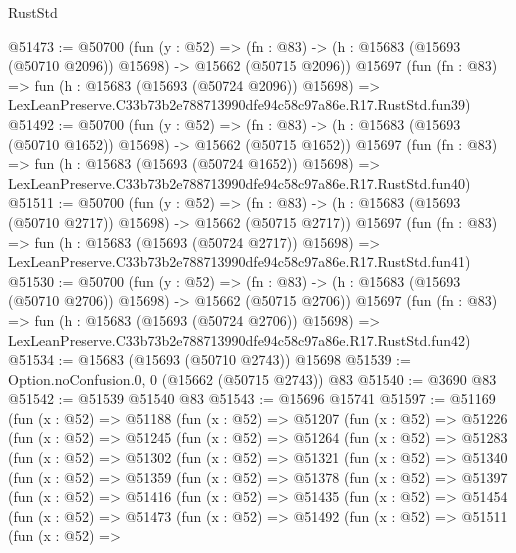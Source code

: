 \begin{lexlean}{RustStd}
\begin{coremodule}
@51473 := @50700
    (fun (y : @52) =>
    (fn : @83) -> (h : @15683 (@15693 (@50710 @2096)) @15698) -> @15662 (@50715 @2096))
    @15697
    (fun (fn : @83) =>
    fun (h : @15683 (@15693 (@50724 @2096)) @15698) =>
    LexLeanPreserve.C33b73b2e788713990dfe94c58c97a86e.R17.RustStd.fun39)
@51492 := @50700
    (fun (y : @52) =>
    (fn : @83) -> (h : @15683 (@15693 (@50710 @1652)) @15698) -> @15662 (@50715 @1652))
    @15697
    (fun (fn : @83) =>
    fun (h : @15683 (@15693 (@50724 @1652)) @15698) =>
    LexLeanPreserve.C33b73b2e788713990dfe94c58c97a86e.R17.RustStd.fun40)
@51511 := @50700
    (fun (y : @52) =>
    (fn : @83) -> (h : @15683 (@15693 (@50710 @2717)) @15698) -> @15662 (@50715 @2717))
    @15697
    (fun (fn : @83) =>
    fun (h : @15683 (@15693 (@50724 @2717)) @15698) =>
    LexLeanPreserve.C33b73b2e788713990dfe94c58c97a86e.R17.RustStd.fun41)
@51530 := @50700
    (fun (y : @52) =>
    (fn : @83) -> (h : @15683 (@15693 (@50710 @2706)) @15698) -> @15662 (@50715 @2706))
    @15697
    (fun (fn : @83) =>
    fun (h : @15683 (@15693 (@50724 @2706)) @15698) =>
    LexLeanPreserve.C33b73b2e788713990dfe94c58c97a86e.R17.RustStd.fun42)
@51534 := @15683 (@15693 (@50710 @2743)) @15698
@51539 := Option.noConfusion.{0, 0} (@15662 (@50715 @2743)) @83
@51540 := @3690 @83
@51542 := @51539 @51540 @83
@51543 := @15696 @15741
@51597 := @51169
    (fun (x : @52) =>
    @51188
      (fun (x : @52) =>
      @51207
        (fun (x : @52) =>
        @51226
          (fun (x : @52) =>
          @51245
            (fun (x : @52) =>
            @51264
              (fun (x : @52) =>
              @51283
                (fun (x : @52) =>
                @51302
                  (fun (x : @52) =>
                  @51321
                    (fun (x : @52) =>
                    @51340
                      (fun (x : @52) =>
                      @51359
                        (fun (x : @52) =>
                        @51378
                          (fun (x : @52) =>
                          @51397
                            (fun (x : @52) =>
                            @51416
                              (fun (x : @52) =>
                              @51435
                                (fun (x : @52) =>
                                @51454
                                  (fun (x : @52) =>
                                  @51473
                                    (fun (x : @52) =>
                                    @51492
                                      (fun (x : @52) =>
                                      @51511
                                        (fun (x : @52) =>

\end{coremodule}
\end{lexlean}
